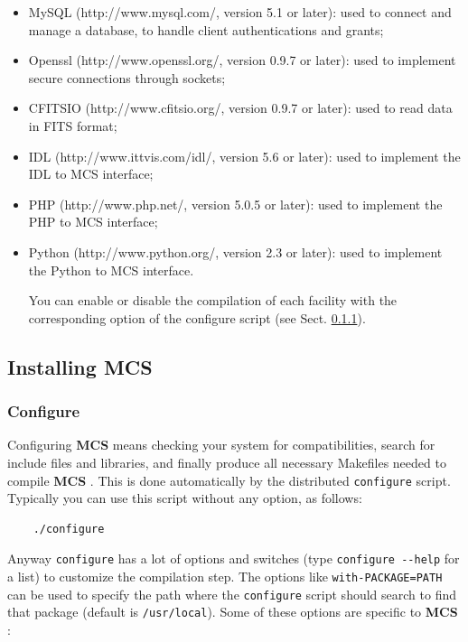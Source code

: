 \documentclass[12pt,titlepage]{article}
\newcommand{\mcs}{\textbf{MCS} }
\begin{document}
\begin{itemize}
\item MySQL (http://www.mysql.com/, version 5.1 or later): used to
  connect and manage a database, to handle client authentications and grants;

\item Openssl (http://www.openssl.org/, version 0.9.7 or later): used
  to implement secure connections through sockets;

\item CFITSIO (http://www.cfitsio.org/, version 0.9.7 or later): used
  to read data in FITS format;

\item IDL (http://www.ittvis.com/idl/, version 5.6 or later): used to
  implement the IDL to MCS interface;

\item PHP (http://www.php.net/, version 5.0.5 or later): used to
  implement the PHP to MCS interface;

\item Python (http://www.python.org/, version 2.3 or later): used to
  implement the Python to MCS interface.

\noindent
You can enable or disable the compilation of each facility with the
corresponding option of the configure script (see Sect.
\ref{sec:configuremcs}).
\end{itemize}

%
\subsection{Installing \mcs}
\label{sec:installing}

%
\subsubsection{Configure}
\label{sec:configuremcs}
Configuring \mcs means checking your system for compatibilities,
search for include files and libraries, and finally produce all
necessary \textsf{Makefile}s needed to compile \mcs. This is done
automatically by the distributed \verb|configure| script. Typically
you can use this script without any option, as follows:

\begin{verbatim}
    ./configure
\end{verbatim}

\noindent
Anyway \verb|configure| has a lot of options and switches (type
\verb|configure --help| for a list) to customize the compilation step.
The options like \verb|with-PACKAGE=PATH| can be used to specify the
path where the \verb|configure| script should search to find that
package (default is \verb|/usr/local|). Some of these options are
specific to \mcs:
\end{document}
